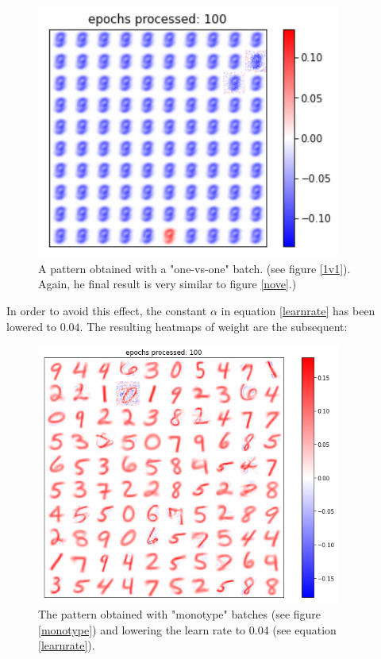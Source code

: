 \documentclass[a4paper]{report}
\begin{document}
\begin{figure} [H]
	\centering
	\includegraphics [width=10cm] {h/nove_1v1.png}
	\caption{A pattern obtained with a "one-vs-one" batch. (see figure \ref{1v1}). Again, he final result is very similar to figure \ref{nove}.)}
\end{figure}

In order to avoid this effect, the constant $\alpha$ in equation \ref{learnrate} has been lowered to $0.04$. The resulting heatmaps of weight are the subsequent:

\begin{figure} [H]
	\centering
	\includegraphics [width=10cm] {h/mono.png}
	\caption{The pattern obtained with "monotype" batches (see figure \ref{monotype}) and lowering the learn rate to 0.04 (see equation \ref{learnrate}).}
	\label{mono_004_heatmap}
\end{figure}
\end{document}
